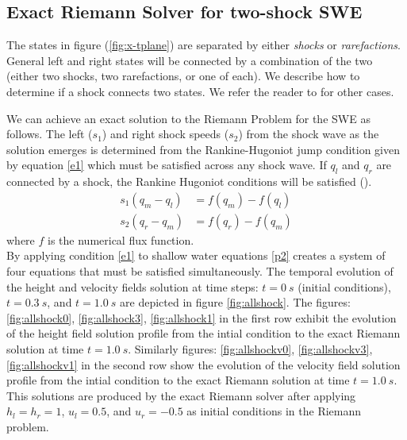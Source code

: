 \documentclass[10pt,a4paper]{article}
\begin{document}
	

	\subsection{Exact Riemann Solver for two-shock SWE}
The states in figure (\ref{fig:x-tplane}) are separated by either {\em shocks} or {\em rarefactions}. General left and right states will be connected by a combination of the two (either two shocks, two rarefactions, or one of each).  We describe how to determine if a shock connects two states.  We refer the reader to \citet{leveque2002finite} for other cases. 

We can achieve an exact solution to the Riemann Problem for the SWE as follows. 
The left ($s_1$) and right shock speeds ($s_2$)  from the shock wave as the solution emerges is determined from the Rankine-Hugoniot jump condition given by equation \eqref{e1}  which must be satisfied across any shock wave.  If $q_l$ and $q_r$ are connected by a shock, the Rankine Hugoniot conditions will be satisfied (\cite{leveque2002finite,toro2001shock}).
	\begin{equation}
		\begin{aligned}
			s_1(q_{m} - q_{l}) & = f(q_{m}) - f(q_{l}) \\
			s_2(q_{r} - q_{m}) & = f(q_{r}) - f(q_{m})
		\end{aligned}
		\label{e1}
	\end{equation}
where $f$ is the numerical flux function. \\

By applying condition  \eqref{e1} to shallow water equations \eqref{p2}  creates a system of four equations that must be satisfied simultaneously. The temporal evolution of the height and velocity fields solution at time steps: $t=0~s$ (initial conditions), $t = 0.3~s$, and $t = 1.0~s$ are  depicted in figure \ref{fig:allshock}. The figures: \ref{fig:allshock0}, \ref{fig:allshock3}, \ref{fig:allshock1} in the first row exhibit the evolution of the height field solution profile from the intial condition to the exact Riemann solution at time $t = 1.0~s$. Similarly figures: \ref{fig:allshockv0}, \ref{fig:allshockv3}, \ref{fig:allshockv1} in the second row show the evolution of the velocity field solution profile from the intial condition to the exact Riemann solution at time $t = 1.0~s$. This solutions are produced by the exact Riemann solver after applying $h_l = h_r = 1$, $u_l  =  0.5$, and $u_r = -0.5$ as initial conditions in  the Riemann problem.
	
\end{document}
